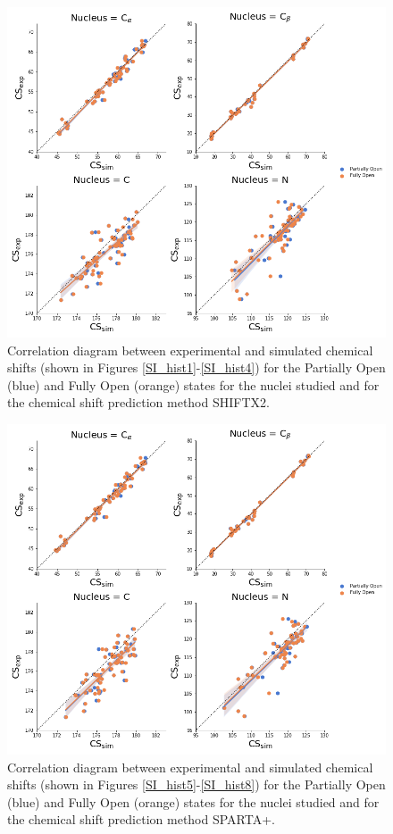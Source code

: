\documentclass[%
 aip,
 amsmath,amssymb,
 preprint,%
]{revtex4-1}
\begin{document}
\begin{figure}[tbp]
	\includegraphics[width=\textwidth]{figures_SI/correlation_shiftx2_print.png}
	 \caption{\scriptsize
 Correlation diagram between experimental and simulated chemical shifts (shown in Figures \ref{SI_hist1}-\ref{SI_hist4}) for the Partially Open (blue) and Fully Open (orange) states for the nuclei studied and for the chemical shift prediction method SHIFTX2. 
}
\label{SI_corr1}
\end{figure}

\begin{figure}[tbp]
	\includegraphics[width=\textwidth]{figures_SI/correlation_sparta_plus_print.png}
	 \caption{\scriptsize
 Correlation diagram between experimental and simulated chemical shifts (shown in Figures \ref{SI_hist5}-\ref{SI_hist8}) for the Partially Open (blue) and Fully Open (orange) states for the nuclei studied and for the chemical shift prediction method SPARTA+. 
}
\label{SI_corr2}
\end{figure}
\end{document}
